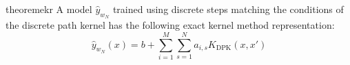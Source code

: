
\begin{restatable}{theorem}{ekr}
\label{thm:ekr}
A model $\hat y_{w_N}$ trained using discrete steps matching the conditions of the discrete path kernel has the following exact kernel method representation:
\begin{equation}
\hat y_{w_N}(x) = b + \sum_{i = 1}^{M}\sum_{s = 1}^N a_{i,s} K_{\text{DPK}}(x, x')
\label{exact}
\end{equation}
\end{restatable}



